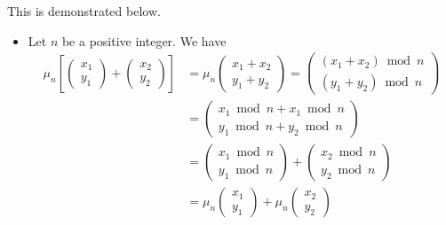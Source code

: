 \documentclass{article}
\begin{document}
\begin{Answer}
\begin{enumerate}[(a)]
{    This is demonstrated below.
    \begin{itemize}
      \item{
        Let $n$ be a positive integer. We have
        \begin{align*}
         \mu_n \left[
           \left(\begin{array}{c}
             x_1 \\ y_1
           \end{array}\right)
           +
           \left(\begin{array}{c}
             x_2 \\ y_2
           \end{array}\right)
         \right]
         &=
          \mu_n
            \left(\begin{array}{c}
              x_1 + x_2 \\
              y_1 + y_2
            \end{array}\right) =
          \left(\begin{array}{c}
            (x_1 + x_2) \bmod n \\
            (y_1 + y_2) \bmod n
          \end{array}\right) \\ &=
          \left(\begin{array}{c}
            x_1 \bmod n + x_1 \bmod n \\
            y_1 \bmod n + y_2 \bmod n
          \end{array}\right) \\ &=
          \left(\begin{array}{c}
            x_1 \bmod n \\
            y_1 \bmod n
          \end{array}\right)
          +
          \left(\begin{array}{c}
            x_2 \bmod n \\
            y_2 \bmod n
          \end{array}\right) \\ &=
          \mu_n\left(\begin{array}{c}
            x_1 \\
            y_1
          \end{array}\right)
          +
          \mu_n\left(\begin{array}{c}
            x_2 \\
            y_2
          \end{array}\right)
        \end{align*}
}
\end{itemize}}
\end{enumerate}
\end{Answer}
\end{document}
